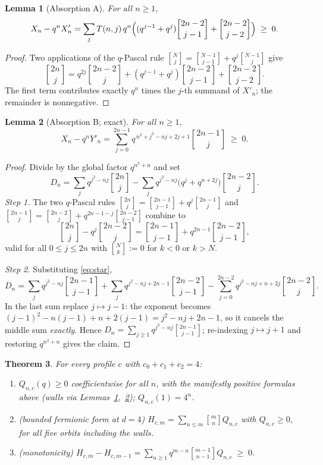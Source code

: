 \documentclass[11pt]{article}
\newtheorem{theorem}{Theorem}[section]
\newtheorem{lemma}[theorem]{Lemma}
\newcommand{\qbin}[2]{\genfrac{[}{]}{0pt}{}{#1}{#2}}
\begin{document}
\begin{lemma}[Absorption A]\label{lem:A}
For all $n\ge1$,
\[
X_n-q^nX'_n=\sum_jT(n,j)\,q^n\Bigl((q^{j-1}+q^{j})\qbin{2n-2}{j-1}
+\qbin{2n-2}{j-2}\Bigr)\;\ge\;0 .
\]
\end{lemma}

\begin{proof}
Two applications of the $q$-Pascal rule
$\qbin{N}{j}=\qbin{N-1}{j-1}+q^j\qbin{N-1}{j}$ give
\[
\qbin{2n}{j}=q^{2j}\qbin{2n-2}{j}
+(q^{j-1}+q^{j})\qbin{2n-2}{j-1}+\qbin{2n-2}{j-2}.
\]
The first term contributes exactly $q^n$ times the $j$-th summand of
$X'_n$; the remainder is nonnegative.
\end{proof}

\begin{lemma}[Absorption B; exact]\label{lem:B}
For all $n\ge1$,
\[
X_n-q^nY'_n
=\sum_{j=0}^{2n-1}q^{\,n^2+j^2-nj+2j+1}\qbin{2n-1}{j}\;\ge\;0 .
\]
\end{lemma}

\begin{proof}
Divide by the global factor $q^{n^2+n}$ and set
\[
D_n=\sum_jq^{j^2-nj}\qbin{2n}{j}
-\sum_jq^{j^2-nj}\bigl(q^{j}+q^{n+2j}\bigr)\qbin{2n-2}{j}.
\]
\emph{Step 1.} The two $q$-Pascal rules
$\qbin{2n}{j}=\qbin{2n-1}{j-1}+q^j\qbin{2n-1}{j}$ and
$\qbin{2n-1}{j}=\qbin{2n-2}{j}+q^{2n-1-j}\qbin{2n-2}{j-1}$ combine to
\begin{equation}\label{eq:star}
\qbin{2n}{j}-q^{j}\qbin{2n-2}{j}
=\qbin{2n-1}{j-1}+q^{2n-1}\qbin{2n-2}{j-1},
\end{equation}
valid for all $0\le j\le 2n$ with $\qbin{N}{k}:=0$ for $k<0$ or $k>N$.

\emph{Step 2.} Substituting \eqref{eq:star},
\[
D_n=\sum_jq^{j^2-nj}\qbin{2n-1}{j-1}
+\sum_jq^{j^2-nj+2n-1}\qbin{2n-2}{j-1}
-\sum_{j=0}^{2n-2}q^{j^2-nj+n+2j}\qbin{2n-2}{j}.
\]
In the last sum replace $j\mapsto j-1$: the exponent becomes
$(j-1)^2-n(j-1)+n+2(j-1)=j^2-nj+2n-1$, so it cancels the middle sum
\emph{exactly}. Hence $D_n=\sum_{j\ge1}q^{j^2-nj}\qbin{2n-1}{j-1}$;
re-indexing $j\mapsto j+1$ and restoring $q^{n^2+n}$ gives the claim.
\end{proof}

\begin{theorem}\label{thm:d4}
For every profile $c$ with $c_0+c_1+c_2=4$:
\begin{enumerate}
\item[\textup{(i)}] $Q_{n,c}(q)\ge0$ coefficientwise for all $n$, with
the manifestly positive formulas above (walls via
Lemmas~\ref{lem:A},~\ref{lem:B}); $Q_{n,c}(1)=4^n$.
\item[\textup{(ii)}] \textup{(bounded fermionic form at $d=4$)}
$H_{c,m}=\sum_{n\le m}\qbin{m}{n}Q_{n,c}$ with $Q_{n,c}\ge0$, for all
five orbits including the walls.
\item[\textup{(iii)}] \textup{(monotonicity)}
$H_{c,m}-H_{c,m-1}
=\sum_{n\ge1}q^{m-n}\qbin{m-1}{n-1}Q_{n,c}\;\ge\;0$.
\end{enumerate}
\end{theorem}
\end{document}
